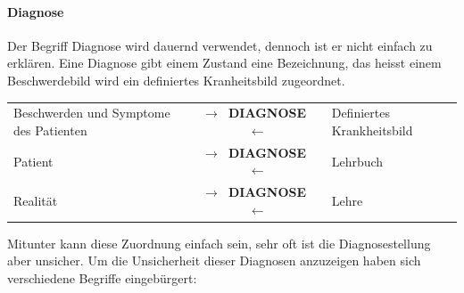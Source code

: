 \paragraph{Diagnose} 

Der Begriff Diagnose wird dauernd verwendet, dennoch ist er
nicht einfach zu erklären. Eine Diagnose gibt einem Zustand
eine Bezeichnung, das heisst einem Beschwerdebild wird ein
definiertes Kranheitsbild zugeordnet.

\begin{tabularx}{\linewidth}{XcX}\toprule
Beschwerden und Symptome des Patienten
&
{\color{darkBlue}\sffamily\bfseries $\rightarrow$~DIAGNOSE~$\leftarrow$}
&
Definiertes Krankheitsbild
\\\addlinespace
Patient
&
{\color{darkBlue}\sffamily\bfseries $\rightarrow$~DIAGNOSE~$\leftarrow$}
&
Lehrbuch
\\\addlinespace
Realität
&
{\color{darkBlue}\sffamily\bfseries $\rightarrow$~DIAGNOSE~$\leftarrow$}
&
Lehre
\\\bottomrule
\end{tabularx}


Mitunter kann diese Zuordnung einfach sein, sehr oft ist die Diagnosestellung
aber unsicher. Um die Unsicherheit dieser Diagnosen
anzuzeigen haben sich verschiedene Begriffe eingebürgert: 


